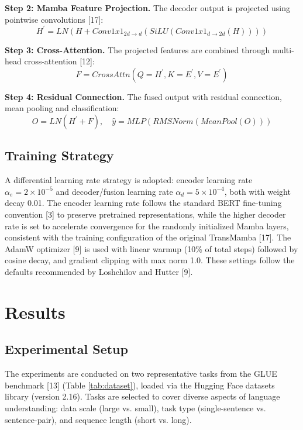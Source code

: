 \documentclass[10pt, conference]{IEEEtran}
\begin{document}
\textbf{Step 2: Mamba Feature Projection.} The decoder output is projected using pointwise convolutions [17]: %
\begin{equation}
H^{\prime}=LN(H+Conv1x1_{2d\rightarrow d}(SiLU(Conv1x1_{d\rightarrow 2d}(H)))) %
\end{equation}

\textbf{Step 3: Cross-Attention.} The projected features are combined through multi-head cross-attention [12]: %
\begin{equation}
F = CrossAttn(Q = H^{\prime}, K = E^{\prime}, V = E^{\prime}) %
\end{equation}

\textbf{Step 4: Residual Connection.} The fused output with residual connection, mean pooling and classification: %
\begin{equation}
O=LN(H^{\prime}+F), \quad \hat{y}=MLP(RMSNorm(MeanPool(O))) %
\end{equation}

\subsection{Training Strategy} %
A differential learning rate strategy is adopted: encoder learning rate $\alpha_{e}= 2\times 10^{-5}$ and decoder/fusion learning rate $\alpha_{d}=5\times 10^{-4}$, both with weight decay 0.01. %
The encoder learning rate follows the standard BERT fine-tuning convention [3] to preserve pretrained representations, while the higher decoder rate is set to accelerate convergence for the randomly initialized Mamba layers, consistent with the training configuration of the original TransMamba [17]. %
The AdamW optimizer [9] is used with linear warmup (10\% of total steps) followed by cosine decay, and gradient clipping with max norm 1.0. %
These settings follow the defaults recommended by Loshchilov and Hutter [9]. %

\section{Results} %

\subsection{Experimental Setup} %
The experiments are conducted on two representative tasks from the GLUE benchmark [13] (Table \ref{tab:dataset}), loaded via the Hugging Face datasets library (version 2.16). %
Tasks are selected to cover diverse aspects of language understanding: data scale (large vs. small), task type (single-sentence vs. sentence-pair), and sequence length (short vs. long). %
\end{document}
